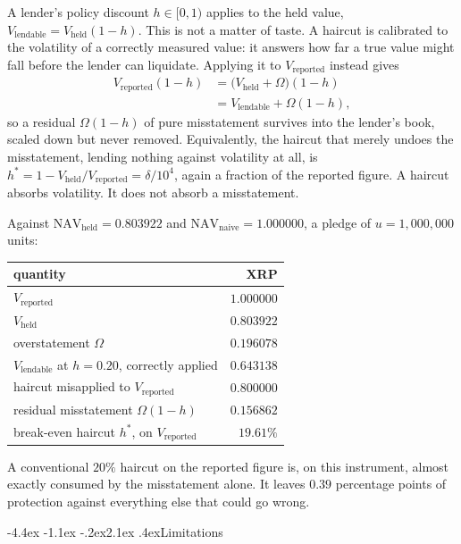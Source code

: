 \documentclass[11pt]{article}
\makeatletter
\renewcommand\section{\@startsection{section}{1}{\z@}%
  {-4.4ex \@plus -1.1ex \@minus -.2ex}{2.1ex \@plus .4ex}{\normalfont\Large\bfseries}}
\theoremstyle{orma}
\theoremstyle{ormaupright}
\makeatother
\begin{document}
A lender's policy discount $h \in [0,1)$ applies to the held value,
$V_{\mathrm{lendable}} = V_{\mathrm{held}} (1 - h)$. This is not a matter of taste. A
haircut is calibrated to the volatility of a correctly measured value: it answers how far a
true value might fall before the lender can liquidate. Applying it to
$V_{\mathrm{reported}}$ instead gives
\begin{align}
  V_{\mathrm{reported}} (1 - h)
  &= \big( V_{\mathrm{held}} + \Omega \big)(1 - h)
  \\[4pt]
  &= V_{\mathrm{lendable}} + \Omega (1 - h),
\end{align}
so a residual $\Omega(1-h)$ of pure misstatement survives into the lender's book, scaled
down but never removed. Equivalently, the haircut that merely undoes the misstatement,
lending nothing against volatility at all, is
$h^{*} = 1 - V_{\mathrm{held}}/V_{\mathrm{reported}} = \delta/10^{4}$, again a fraction of
the reported figure. A haircut absorbs volatility. It does not absorb a misstatement.

Against $\mathrm{NAV}_{\mathrm{held}} = 0.803922$ and
$\mathrm{NAV}_{\mathrm{naive}} = 1.000000$, a pledge of $u = 1{,}000{,}000$ units:

\begin{center}
\begin{tabular}{lr}
\toprule
quantity & XRP \\
\midrule
$V_{\mathrm{reported}}$ & $1.000000$ \\
$V_{\mathrm{held}}$ & $0.803922$ \\
overstatement $\Omega$ & $\mathbf{0.196078}$ \\
\addlinespace
$V_{\mathrm{lendable}}$ at $h = 0.20$, correctly applied & $0.643138$ \\
haircut misapplied to $V_{\mathrm{reported}}$ & $0.800000$ \\
residual misstatement $\Omega(1-h)$ & $0.156862$ \\
\addlinespace
break-even haircut $h^{*}$, on $V_{\mathrm{reported}}$ & $19.61\%$ \\
\bottomrule
\end{tabular}
\end{center}

A conventional $20\%$ haircut on the reported figure is, on this instrument, almost exactly
consumed by the misstatement alone. It leaves $0.39$ percentage points of protection against
everything else that could go wrong.

\section{Limitations}
\end{document}
